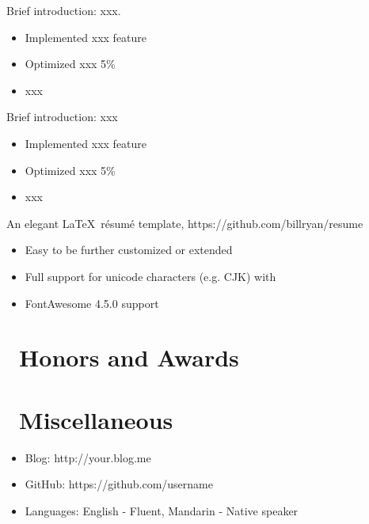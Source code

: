 \documentclass{resume}
\begin{document}
Brief introduction: xxx.
\begin{itemize}
  \item Implemented xxx feature
  \item Optimized xxx 5\%
  \item xxx
\end{itemize}

Brief introduction: xxx
\begin{itemize}
  \item Implemented xxx feature
  \item Optimized xxx 5\%
  \item xxx
\end{itemize}

An elegant \LaTeX\ résumé template, https://github.com/billryan/resume
\begin{itemize}
  \item Easy to be further customized or extended
  \item Full support for unicode characters (e.g. CJK) with \XeLaTeX\
  \item FontAwesome 4.5.0 support
\end{itemize}





\section{\faHeartO\ Honors and Awards}

\section{\faInfo\ Miscellaneous}
\begin{itemize}[parsep=0.5ex]
  \item Blog: http://your.blog.me
  \item GitHub: https://github.com/username
  \item Languages: English - Fluent, Mandarin - Native speaker
\end{itemize}

%
%
\end{document}
